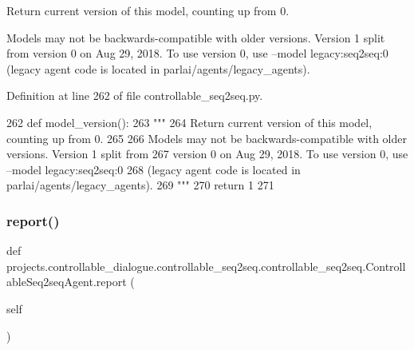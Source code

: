 \begin{DoxyVerb}Return current version of this model, counting up from 0.

Models may not be backwards-compatible with older versions. Version 1 split from
version 0 on Aug 29, 2018. To use version 0, use --model legacy:seq2seq:0
(legacy agent code is located in parlai/agents/legacy_agents).
\end{DoxyVerb}
 

Definition at line 262 of file controllable\+\_\+seq2seq.\+py.


\begin{DoxyCode}
262     \textcolor{keyword}{def }model\_version():
263         \textcolor{stringliteral}{"""}
264 \textcolor{stringliteral}{        Return current version of this model, counting up from 0.}
265 \textcolor{stringliteral}{}
266 \textcolor{stringliteral}{        Models may not be backwards-compatible with older versions. Version 1 split from}
267 \textcolor{stringliteral}{        version 0 on Aug 29, 2018. To use version 0, use --model legacy:seq2seq:0}
268 \textcolor{stringliteral}{        (legacy agent code is located in parlai/agents/legacy\_agents).}
269 \textcolor{stringliteral}{        """}
270         \textcolor{keywordflow}{return} 1
271 
\end{DoxyCode}
\mbox{\label{classprojects_1_1controllable__dialogue_1_1controllable__seq2seq_1_1controllable__seq2seq_1_1ControllableSeq2seqAgent_aa976447be9a59cdba202d947bb5dafbb}} 
\subsubsection{\texorpdfstring{report()}{report()}}
{\footnotesize\ttfamily def projects.\+controllable\+\_\+dialogue.\+controllable\+\_\+seq2seq.\+controllable\+\_\+seq2seq.\+Controllable\+Seq2seq\+Agent.\+report (\begin{DoxyParamCaption}\item[{}]{self }\end{DoxyParamCaption})}

